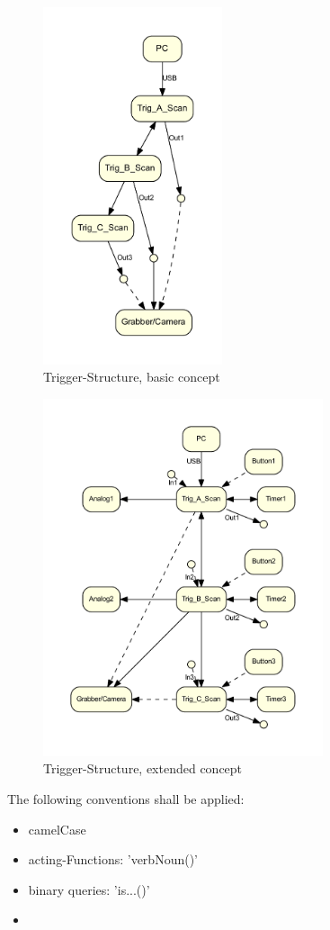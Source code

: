 		\begin{figure}[ht]
			\centering
			\includegraphics[height=105mm]{src/_Octane_Trigger_basic.pdf}
			\caption{Trigger-Structure, basic concept}
			\label{_Octane_Trigger_basic}
		\end{figure}
		\begin{figure}[ht]
			\centering
			\includegraphics[height=105mm]{src/_Octane_Trigger_extended_neato.pdf}
			\caption{Trigger-Structure, extended concept}
			\label{_Octane_Trigger_extended_kfdp}
		\end{figure}

	{	The following conventions shall be applied:
		\begin{itemize} \setlength\itemsep{1px}
		\item camelCase
		\item acting-Functions: 'verbNoun()'
		\item binary queries: 'is...()'
		\item 
		\end{itemize}
	}

